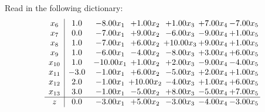 \documentclass[9pt]{article}
\begin{document}
Read in the following dictionary:
\[\begin{array}{c| c c@{\hskip 2pt} c@{\hskip 2pt} c@{\hskip 2pt} c@{\hskip 2pt} c@{\hskip 2pt} }
 x_{6}   &  1.0 & -8.00 x_{1} & +  1.00 x_{2} & +  1.00 x_{3} & +  7.00 x_{4} & -7.00 x_{5}\\
 x_{7}   &  0.0 & -7.00 x_{1} & +  9.00 x_{2} & -6.00 x_{3} & -9.00 x_{4} & +  1.00 x_{5}\\
 x_{8}   &  1.0 & -7.00 x_{1} & +  6.00 x_{2} & + 10.00 x_{3} & +  9.00 x_{4} & +  1.00 x_{5}\\
 x_{9}   &  1.0 & -6.00 x_{1} & -4.00 x_{2} & -8.00 x_{3} & +  3.00 x_{4} & +  6.00 x_{5}\\
 x_{10}   &  1.0 & -10.00 x_{1} & +  1.00 x_{2} & +  2.00 x_{3} & -9.00 x_{4} & -4.00 x_{5}\\
 x_{11}   &  -3.0 & -1.00 x_{1} & +  6.00 x_{2} & -5.00 x_{3} & +  2.00 x_{4} & +  1.00 x_{5}\\
 x_{12}   &  2.0 & -1.00 x_{1} & + 10.00 x_{2} & -4.00 x_{3} & +  1.00 x_{4} & +  6.00 x_{5}\\
 x_{13}   &  3.0 & -1.00 x_{1} & -5.00 x_{2} & +  8.00 x_{3} & -5.00 x_{4} & +  7.00 x_{5}\\
\hline
z    &  0.0 & -3.00 x_{1} & +  5.00 x_{2} & -3.00 x_{3} & -4.00 x_{4} & -3.00 x_{5}\\
\end{array}\]
\end{document}
